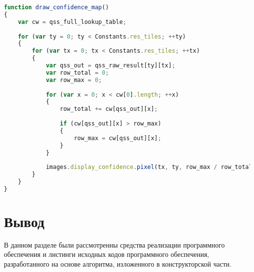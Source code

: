 \begin{lstlisting}[label=qmap,caption=Функция заполнения карты достоверности, language=javascript]
function draw_confidence_map()
{
	var cw = qss_full_lookup_table;
		
	for (var ty = 0; ty < Constants.res_tiles; ++ty)
	{
		for (var tx = 0; tx < Constants.res_tiles; ++tx)
		{
			var qss_out = qss_raw_result[ty][tx];
			var row_total = 0;
			var row_max = 0;
		
			for (var x = 0; x < cw[0].length; ++x)
			{
				row_total += cw[qss_out][x];
					
				if (cw[qss_out][x] > row_max)
				{
					row_max = cw[qss_out][x];
				}
			}
	
			images.display_confidence.pixel(tx, ty, row_max / row_total);
		}
	}
}
\end{lstlisting}

\section*{Вывод}

В данном разделе были рассмотренны средства реализации программного обеспечения и листинги исходных кодов программного обеспечения, разработанного на основе алгоритма, изложенного в конструкторской части.
